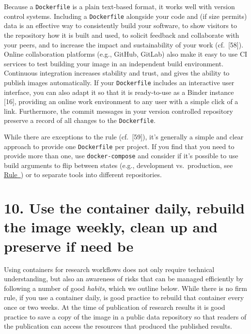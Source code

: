 \documentclass[10pt,letterpaper]{article}
\begin{document}
Because a \texttt{Dockerfile} is a plain text-based format, it works
well with version control systems. Including a \texttt{Dockerfile}
alongside your code and (if size permits) data is an effective way to
consistently build your software, to show visitors to the repository how
it is built and used, to solicit feedback and collaborate with your
peers, and to increase the impact and sustainability of your work
(cf.~{[}58{]}). Online collaboration platforms (e.g., GitHub, GitLab)
also make it easy to use CI services to test building your image in an
independent build environment. Continuous integration increases
stability and trust, and gives the ability to publish images
automatically. If your \texttt{Dockerfile} includes an interactive user
interface, you can also adapt it so that it is ready-to-use as a Binder
instance {[}16{]}, providing an online work environment to any user with
a simple click of a link. Furthermore, the commit messages in your
version controlled repository preserve a record of all changes to the
\texttt{Dockerfile}.

While there are exceptions to the rule (cf.~{[}59{]}), it's generally a
simple and clear approach to provide one \texttt{Dockerfile} per
project. If you find that you need to provide more than one, use
\texttt{docker-compose} and consider if it's possible to use build
arguments to flip between states (e.g., development vs.~production, see
\hyperref[{rule:interactive}]{Rule~}) or to
separate tools into different repositories.

\hypertarget{use-the-container-daily-rebuild-the-image-weekly-clean-up-and-preserve-if-need-be}{%
\section*{10. Use the container daily, rebuild the image weekly, clean
up and preserve if need
be}\label{use-the-container-daily-rebuild-the-image-weekly-clean-up-and-preserve-if-need-be}}

  \label{rule:usage} 

Using containers for research workflows does not only require technical
understanding, but also an awareness of risks that can be managed
efficiently by following a number of good \emph{habits}, which we
outline below. While there is no firm rule, if you use a container
daily, is good practice to rebuild that container every once or two
weeks. At the time of publication of research results it is good
practice to save a copy of the image in a public data repository so that
readers of the publication can access the resources that produced the
published results.
\end{document}
